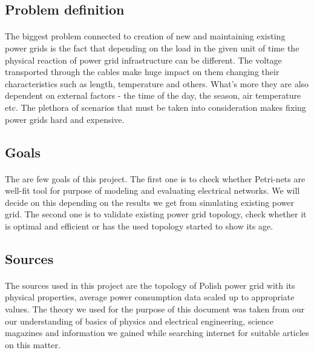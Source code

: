 \documentclass[a4paper]{article}
\begin{document}
\subsection{Problem definition}
\label{sec:problemDefinition}
\paragraph{}
The biggest problem connected to creation of new and maintaining existing power grids is the fact that depending on the load in the given unit of time the physical reaction of power grid infrastructure can be different. The voltage transported through the cables make huge impact on them changing their characteristics such as length, temperature and others. What's more they are also dependent on external factors - the time of the day, the season, air temperature etc. The plethora of scenarios that must be taken into consideration makes fixing power grids hard and expensive.

\subsection{Goals} 
\label{sec:goals}
\paragraph{}
The are few goals of this project. The first one is to check whether Petri-nets are well-fit tool for purpose of modeling and evaluating electrical networks. We will decide on this depending on the results we get from simulating existing power grid. The second one is to validate existing power grid topology, check whether it is optimal and efficient or has the used topology started to show its age. 

\subsection{Sources}
\label{sec:sources}
\paragraph{}
The sources used in this project are the topology of Polish power grid with its physical properties, average power consumption data scaled up to appropriate values. The theory we used for the purpose of this document was taken from our our understanding of basics of physics and electrical engineering, science magazines and information we gained while searching internet for suitable articles on this matter.
\end{document}
